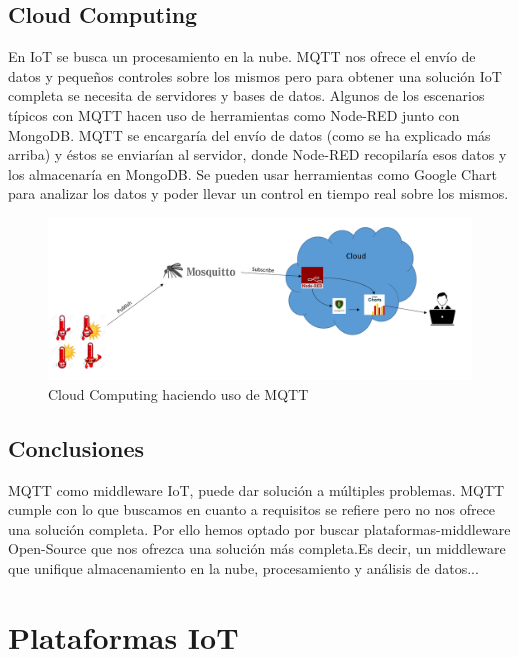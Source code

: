\documentclass[12pt, twoside]{book}
\begin{document}
\section{Cloud Computing}
En IoT se busca un procesamiento en la nube. MQTT nos ofrece el envío de datos y pequeños controles sobre los mismos pero para obtener una solución IoT completa se necesita de servidores y bases de datos. Algunos de los escenarios típicos con MQTT hacen uso de herramientas como Node-RED\cite{nodered} junto con MongoDB\cite{mongo}. MQTT se encargaría del envío de datos (como se ha explicado más arriba) y éstos se enviarían al servidor, donde Node-RED recopilaría esos datos y los almacenaría en MongoDB. Se pueden usar herramientas como Google Chart para analizar los datos y poder llevar un control en tiempo real sobre los mismos. 
\begin{figure}[H]
\centering
\includegraphics[scale=0.4]{images/cloud_mqtt1}
\caption{Cloud Computing haciendo uso de MQTT}\label{L408}
\end{figure}
\section{Conclusiones}
MQTT como middleware IoT, puede dar solución a múltiples problemas. MQTT cumple con lo que buscamos en cuanto a requisitos se refiere pero no nos ofrece una solución completa. Por ello hemos optado por buscar plataformas-middleware Open-Source que nos ofrezca una solución más completa.Es decir, un middleware que unifique almacenamiento en la nube, procesamiento y análisis de datos...

\chapter{Plataformas IoT}
\end{document}
